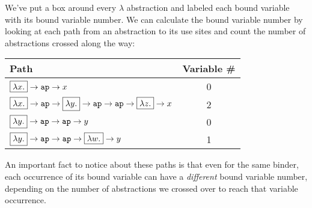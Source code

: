 \documentclass[11pt]{article}
\begin{document}
We've put a box around every $\lambda$ abstraction and labeled each bound variable with its bound variable number.
We can calculate the bound variable number by looking at each path from an abstraction to its use sites and count the number of abstractions crossed along the way:
\begin{center}
  \newcommand{\boxabs}[1]{\mbox{\fbox{$\lambda{#1}.$}}}
  \begin{tabular}{l|c}
  Path & Variable \# \\ \hline

  $\boxabs{x} \to \kw{ap} \to x$ & 0 \\
  $\boxabs{x} \to \kw{ap} \to \boxabs{y} \to \kw{ap} \to \kw{ap} \to \boxabs{z} \to x$ & 2 \\
  $\boxabs{y} \to \kw{ap} \to \kw{ap} \to y$ & 0 \\
  $\boxabs{y} \to \kw{ap} \to \kw{ap} \to \boxabs{w} \to y$ & 1 \\
  \end{tabular}
\end{center}

An important fact to notice about these paths is that even for the same binder, each occurrence of its bound variable can have a \emph{different} bound variable number, depending on the number of abstractions we crossed over to reach that variable occurrence.
\end{document}
